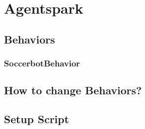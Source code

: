 \chapter{Agentspark}

\section{Behaviors}

\subsection{SoccerbotBehavior}

\section{How to change Behaviors?}

\section{Setup Script}

